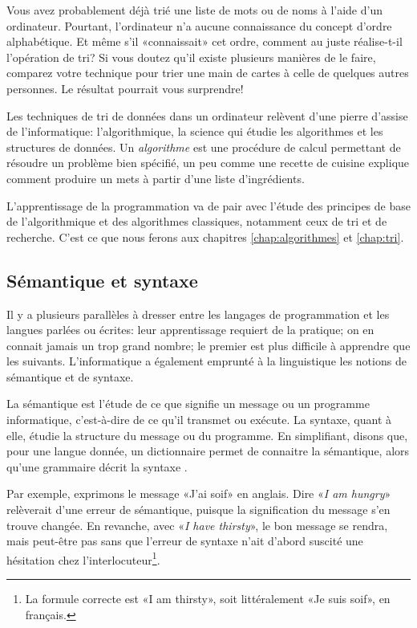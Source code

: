 Vous avez probablement déjà trié une liste de mots ou de noms à l'aide
d'un ordinateur. Pourtant, l'ordinateur n'a aucune connaissance du
concept d'ordre alphabétique. Et même s'il «connaissait» cet ordre,
comment au juste réalise-t-il l'opération de tri? Si vous doutez qu'il
existe plusieurs manières de le faire, comparez votre technique pour
trier une main de cartes à celle de quelques autres personnes. Le
résultat pourrait vous surprendre!

Les techniques de tri de données dans un ordinateur relèvent d'une
pierre d'assise de l'informatique:
l'algorithmique, la science qui étudie les
algorithmes et les structures de données. Un
\emph{algorithme} est une procédure de calcul
permettant de résoudre un problème bien spécifié, un peu comme une
recette de cuisine explique comment produire un mets à partir d'une
liste d'ingrédients.

L'apprentissage de la programmation va de pair avec l'étude des
principes de base de l'algorithmique et des algorithmes classiques,
notamment ceux de tri et de recherche. C'est ce que nous ferons aux
chapitres \ref{chap:algorithmes} et \ref{chap:tri}.

\subsection{Sémantique et syntaxe}
\label{sec:informatique:concepts:semantique}

Il y a plusieurs parallèles à dresser entre les langages de
programmation et les langues parlées ou écrites: leur apprentissage
requiert de la pratique; on en connait jamais un trop grand nombre; le
premier est plus difficile à apprendre que les suivants.
L'informatique a également emprunté à la linguistique les notions de
sémantique et de syntaxe.

La sémantique est l'étude de ce que signifie un message ou un
programme informatique, c'est-à-dire de ce qu'il transmet ou exécute.
La syntaxe, quant à elle, étudie la structure du message ou du
programme. En simplifiant, disons que, pour une langue donnée, un
dictionnaire permet de connaitre la sémantique, alors qu'une grammaire
décrit la syntaxe \citep{Hebenstreit:semantique}.

Par exemple, exprimons le message «J'ai soif» en anglais. Dire
«\emph{I am hungry}» relèverait d'une erreur de sémantique, puisque la
signification du message s'en trouve changée. En revanche, avec
«\emph{I have thirsty}», le bon message se rendra, mais peut-être pas
sans que l'erreur de syntaxe n'ait d'abord suscité une hésitation chez
l'interlocuteur\footnote{%
  La formule correcte est «I am thirsty», soit littéralement «Je suis
  soif», en français.}.

